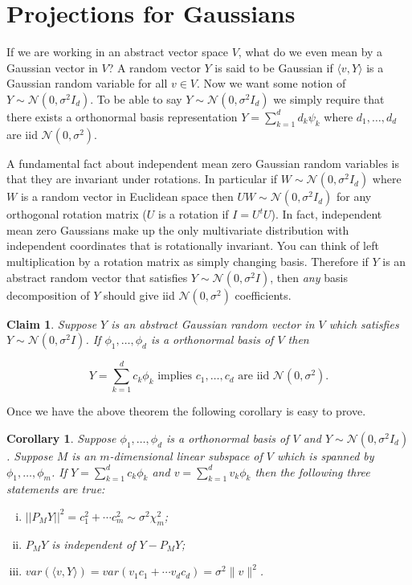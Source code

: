 \documentclass[11pt]{report}
\newtheorem{claim}{Claim}
\newtheorem{corollary}{Corollary}
\begin{document}
\section{Projections for Gaussians}


If we are working in an abstract vector space $V$, what do we even mean by a Gaussian vector in $V$? A random vector $Y$ is said to be Gaussian if $\langle v,Y\rangle$ is a Gaussian random variable for all $v\in V$. Now we want some notion of $Y\sim \mathcal N(0,\sigma^2 I_d)$. To be able to say $Y\sim \mathcal N(0,\sigma^2 I_d)$ we simply require that there exists a orthonormal basis representation $Y= \sum_{k=1}^d d_k \psi_k$ where $d_1,\ldots, d_d$ are iid $\mathcal N(0,\sigma^2)$. 

A fundamental fact about independent mean zero Gaussian random variables is that they are invariant under rotations. In particular if $W \sim \mathcal N\left(0, \sigma^2 I_d\right)$ where $W$ is a random vector in Euclidean space then $UW \sim \mathcal N\left(0, \sigma^2I_d\right)$ for any orthogonal rotation matrix ($U$ is a rotation if  $I = U^{t}U$). In fact, independent mean zero Gaussians make up the only multivariate distribution with independent coordinates that is rotationally invariant. 
You can think of left multiplication by a rotation matrix as simply changing basis. Therefore if  $Y$ is an abstract random vector that satisfies $Y\sim \mathcal N(0,\sigma^2 I)$, then {\em any} basis decomposition of $Y$ should give iid $\mathcal N(0,\sigma^2)$ coefficients. 

\begin{claim}
Suppose $Y$ is an abstract Gaussian random vector in $V$ which satisfies $Y\sim \mathcal N(0,\sigma^2 I)$. If $\phi_1,\ldots, \phi_d$ is a orthonormal basis of $V$ then 
 
 \[ 
 \boxed{Y = \sum_{k=1}^d c_k \phi_k \text{ implies } c_1,\ldots, c_d \text{ are iid $\mathcal N(0,\sigma^2)$.}}
 \]
\end{claim}

Once we have the above theorem the following corollary is easy to prove.

\begin{corollary}\label{cor2}
Suppose $\phi_1,\ldots, \phi_d$ is a orthonormal basis of $V$ and $Y\sim \mathcal N(0,\sigma^2 I_d)$. Suppose $M$ is an $m$-dimensional linear subspace of $V$ which is spanned by $\phi_1,\ldots, \phi_m$. If $Y = \sum_{k=1}^d c_k \phi_k$ and $v = \sum_{k=1}^d v_k \phi_k$ then the following three statements are true:
\begin{enumerate}[(i)]
\item $||P_MY||^2 = c_1^2+\cdots c_m^2 \sim \sigma^2 \chi^2_m$;
\item $P_MY$ is independent of  $Y-P_MY$;
\item $var(\langle v,Y\rangle) = var( v_1 c_1+\cdots v_dc_d) =  \sigma^2 \| v \|^2$.
\end{enumerate}
\end{corollary}
\end{document}
